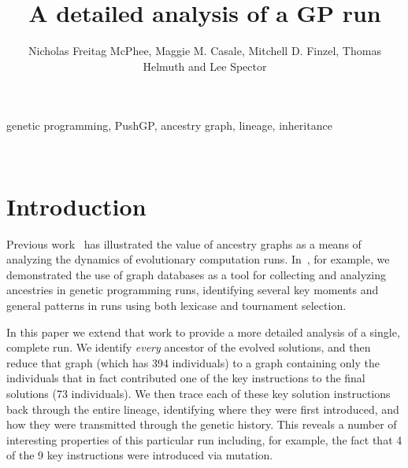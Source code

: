 %

\title*{A detailed analysis of a GP run}
\author{Nicholas Freitag McPhee, Maggie M. Casale, Mitchell D. Finzel, Thomas Helmuth and Lee Spector}

\maketitle


\begin{keywords}
	genetic programming, PushGP, ancestry graph, lineage, inheritance
\end{keywords}
\\
\section{Introduction}
\label{sec:introduction}


Previous work~\citep{McPhee:2015:GPTP, donatuccianalysis, Burlacu:2013:GECCOcomp:new, Burlacu:CIEES:2015, kuber2014ancestral} has
illustrated the value of ancestry graphs as a means of analyzing the dynamics
of evolutionary computation runs. In~\cite{McPhee:2015:GPTP}, for example, we
demonstrated the use of graph databases as a tool for collecting and analyzing
ancestries in genetic programming runs, identifying several key moments and
general patterns in runs using both lexicase and tournament selection.

In this paper we extend that work to provide a more detailed analysis of a
single, complete run. We identify \emph{every} ancestor of the evolved 
solutions, and
then reduce that graph (which has 394 individuals) to a graph containing only 
the individuals that in fact contributed one of the key instructions to 
the final solutions (73 individuals). We then trace each of these key solution
instructions back through the entire lineage, identifying where they were first
introduced, and how they were transmitted through the genetic history. This
reveals a number of interesting properties of this particular run including,
for example, the fact that 4 of the 9 key instructions were introduced via 
mutation.

